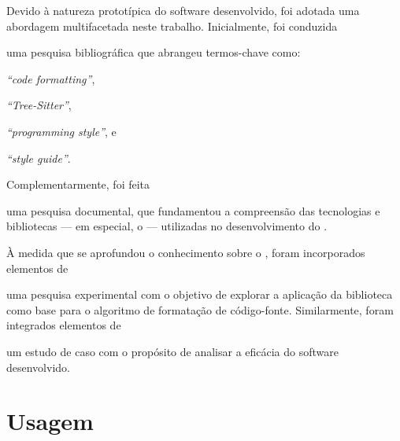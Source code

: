 \documentclass
  [11pt,a4paper,english,brazil,openright,sumario=tradicional,twoside]
  {abntex2}
\begin{document}
  Devido à natureza prototípica do software desenvolvido, foi adotada uma
  abordagem multifacetada neste trabalho. Inicialmente, foi conduzida
  \begin{inparaenum}
    \item uma pesquisa bibliográfica que abrangeu termos-chave como:
          \begin{inparaenum}
            \item \textit{``code formatting''},
            \item \textit{``Tree-Sitter''},
            \item \textit{``programming style''}, e
            \item \textit{``style guide''}.
          \end{inparaenum}
          Complementarmente, foi feita
    \item uma pesquisa documental, que fundamentou a compreensão das
          tecnologias e bibliotecas --- em especial, o \treesitter{} ---
          utilizadas no desenvolvimento do \witchcooking.

          À medida que se aprofundou o conhecimento sobre o \treesitter, foram
          incorporados elementos de
    \item uma pesquisa experimental com o objetivo de explorar a aplicação da
          biblioteca como base para o algoritmo de formatação de código-fonte.
          Similarmente, foram integrados elementos de
    \item um estudo de caso com o propósito de analisar a eficácia do software
          desenvolvido.
  \end{inparaenum}


  \section{Usagem}
  \label{section:usage}
\end{document}
